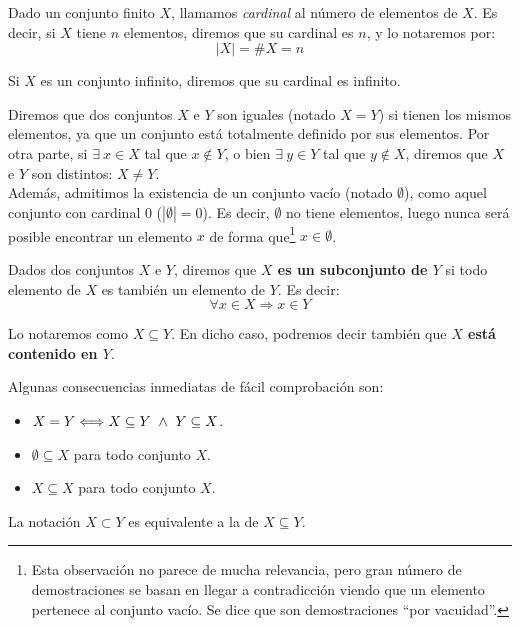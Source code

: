 \begin{definicion}
    Dado un conjunto finito $X$, llamamos \emph{cardinal} al número de elementos de $X$. Es decir, si $X$ tiene $n$ elementos, diremos que su cardinal es $n$, y lo notaremos por:
    $$|X| = \#X = n$$

    Si $X$ es un conjunto infinito, diremos que su cardinal es infinito.
\end{definicion}

Diremos que dos conjuntos $X$ e $Y$ son iguales (notado $X = Y$) si tienen los mismos elementos, ya que un conjunto está totalmente definido por sus elementos. Por otra parte, si $\exists \ x \in X$ tal que $x \notin Y$, o bien $\exists \ y \in Y$ tal que $y \notin X$, diremos que $X$ e $Y$ son distintos: $X \neq Y$.\\

Además, admitimos la existencia de un conjunto vacío (notado $\emptyset$), como aquel conjunto con cardinal 0 ($|\emptyset| = 0$). Es decir, $\emptyset$ no tiene elementos, luego nunca será posible encontrar un elemento $x$ de forma que\footnote{Esta observación no parece de mucha relevancia, pero gran número de demostraciones se basan en llegar a contradicción viendo que un elemento pertenece al conjunto vacío. Se dice que son demostraciones ``por vacuidad''.} $x\in \emptyset $.

\begin{definicion}[Subconjunto]
    Dados dos conjuntos $X$ e $Y$, diremos que \textbf{$X$ es un subconjunto de $Y$} si todo elemento de $X$ es también un elemento de $Y$. Es decir:
    $$\forall x \in X \Rightarrow x \in Y$$
    
    Lo notaremos como $X \subseteq Y$. En dicho caso, podremos decir también que \textbf{$X$ está contenido en $Y$}.
\end{definicion}

Algunas consecuencias inmediatas de fácil comprobación son:
\begin{itemize}
    \item $X = Y \Longleftrightarrow X \subseteq Y \ \land \  Y \subseteq X$.
    \item $\emptyset \subseteq X$ para todo conjunto $X$.
    \item $X \subseteq X$ para todo conjunto $X$.
\end{itemize}
\begin{notacion}
    La notación $X \subset Y$ es equivalente a la de $X \subseteq Y$.
\end{notacion}

